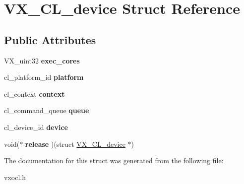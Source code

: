 \hypertarget{structVX__CL__device}{\section{V\-X\-\_\-\-C\-L\-\_\-device Struct Reference}
\label{structVX__CL__device}
}
\subsection*{Public Attributes}
\begin{DoxyCompactItemize}
\item 
\hypertarget{structVX__CL__device_ae4fe30275eabc6f347c14c15cc6151ce}{V\-X\-\_\-uint32 {\bfseries exec\-\_\-cores}}\label{structVX__CL__device_ae4fe30275eabc6f347c14c15cc6151ce}

\item 
\hypertarget{structVX__CL__device_ad9e0f9a0f479e329f5f75d65cc7b6a38}{cl\-\_\-platform\-\_\-id {\bfseries platform}}\label{structVX__CL__device_ad9e0f9a0f479e329f5f75d65cc7b6a38}

\item 
\hypertarget{structVX__CL__device_a9ba828970603b890e7027bf0345404d1}{cl\-\_\-context {\bfseries context}}\label{structVX__CL__device_a9ba828970603b890e7027bf0345404d1}

\item 
\hypertarget{structVX__CL__device_a70c0336674e097106855d3c434e21dd2}{cl\-\_\-command\-\_\-queue {\bfseries queue}}\label{structVX__CL__device_a70c0336674e097106855d3c434e21dd2}

\item 
\hypertarget{structVX__CL__device_a0e4d1f3d09f8f8837bb022f90e21aebd}{cl\-\_\-device\-\_\-id {\bfseries device}}\label{structVX__CL__device_a0e4d1f3d09f8f8837bb022f90e21aebd}

\item 
\hypertarget{structVX__CL__device_a62cd06719ee42515b46cd58fff5176de}{void($\ast$ {\bfseries release} )(struct \hyperlink{structVX__CL__device}{V\-X\-\_\-\-C\-L\-\_\-device} $\ast$)}\label{structVX__CL__device_a62cd06719ee42515b46cd58fff5176de}

\end{DoxyCompactItemize}


The documentation for this struct was generated from the following file\-:\begin{DoxyCompactItemize}
\item 
vxocl.\-h\end{DoxyCompactItemize}
